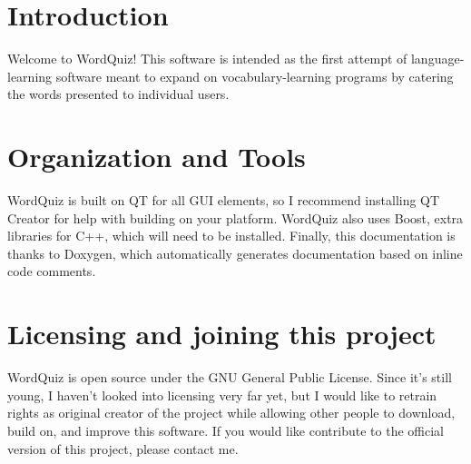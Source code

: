 \hypertarget{index_intro_sec}{}\section{Introduction}\label{index_intro_sec}
Welcome to WordQuiz! This software is intended as the first attempt of language-\/learning software meant to expand on vocabulary-\/learning programs by catering the words presented to individual users.\hypertarget{index_organization_sec}{}\section{Organization and Tools}\label{index_organization_sec}
WordQuiz is built on QT for all GUI elements, so I recommend installing QT Creator for help with building on your platform. WordQuiz also uses Boost, extra libraries for C++, which will need to be installed. Finally, this documentation is thanks to Doxygen, which automatically generates documentation based on inline code comments.\hypertarget{index_licensing_sec}{}\section{Licensing and joining this project}\label{index_licensing_sec}
WordQuiz is open source under the GNU General Public License. Since it's still young, I haven't looked into licensing very far yet, but I would like to retrain rights as original creator of the project while allowing other people to download, build on, and improve this software. If you would like contribute to the official version of this project, please contact me. 